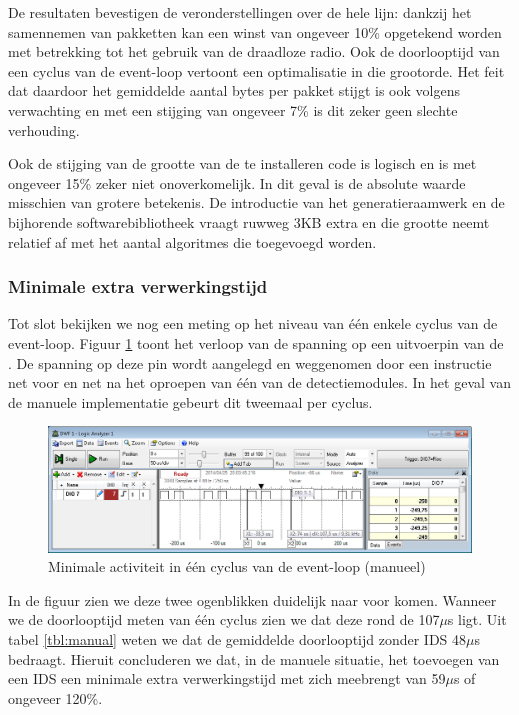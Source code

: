 De resultaten bevestigen de veronderstellingen over de hele lijn: dankzij het
samennemen van pakketten kan een winst van ongeveer 10\% opgetekend worden met
betrekking tot het gebruik van de draadloze radio. Ook de doorlooptijd van een
cyclus van de event-loop vertoont een optimalisatie in die grootorde. Het feit
dat daardoor het gemiddelde aantal bytes per pakket stijgt is ook volgens
verwachting en met een stijging van ongeveer 7\% is dit zeker geen slechte
verhouding.

Ook de stijging van de grootte van de te installeren code is logisch en is met
ongeveer 15\% zeker niet onoverkomelijk. In dit geval is de absolute waarde
misschien van grotere betekenis. De introductie van het generatieraamwerk en de
bijhorende softwarebibliotheek vraagt ruwweg 3KB extra en die grootte neemt
relatief af met het aantal algoritmes die toegevoegd worden.

\subsubsection{Minimale extra verwerkingstijd}

Tot slot bekijken we nog een meting op het niveau van \'e\'en enkele cyclus van
de event-loop. Figuur \ref{fig:logic-analyser-manual} toont het verloop van de
spanning op een uitvoerpin van de \mcu. De spanning op deze pin wordt aangelegd
en weggenomen door een instructie net voor en net na het oproepen van \'e\'en
van de detectiemodules. In het geval van de manuele implementatie gebeurt dit
tweemaal per cyclus.

\begin{figure}[ht]
  \centering
  \includegraphics[width=\linewidth]{../src/demo/idle-event-loop-both-manual.png}
  \caption{Minimale activiteit in \'e\'en cyclus van de event-loop (manueel)}
  \label{fig:logic-analyser-manual}
\end{figure}

\vspace{-4mm}

In de figuur zien we deze twee ogenblikken duidelijk naar voor komen. Wanneer
we de doorlooptijd meten van \'e\'en cyclus zien we dat deze rond de 107$\mu$s
ligt. Uit tabel \ref{tbl:manual} weten we dat de gemiddelde doorlooptijd
zonder IDS 48$\mu$s bedraagt. Hieruit concluderen we dat, in de manuele
situatie, het toevoegen van een IDS een minimale extra verwerkingstijd met zich
meebrengt van 59$\mu$s of ongeveer 120\%.

